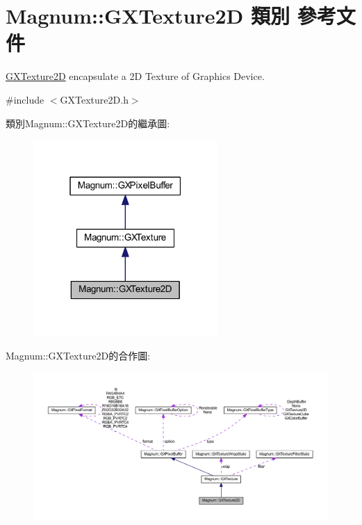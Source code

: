 \hypertarget{class_magnum_1_1_g_x_texture2_d}{}\section{Magnum\+:\+:G\+X\+Texture2D 類別 參考文件}
\label{class_magnum_1_1_g_x_texture2_d}


\hyperlink{class_magnum_1_1_g_x_texture2_d}{G\+X\+Texture2D} encapsulate a 2D Texture of Graphics Device.  




{\ttfamily \#include $<$G\+X\+Texture2\+D.\+h$>$}



類別\+Magnum\+:\+:G\+X\+Texture2\+D的繼承圖\+:\nopagebreak
\begin{figure}[H]
\begin{center}
\leavevmode
\includegraphics[width=199pt]{class_magnum_1_1_g_x_texture2_d__inherit__graph}
\end{center}
\end{figure}


Magnum\+:\+:G\+X\+Texture2\+D的合作圖\+:\nopagebreak
\begin{figure}[H]
\begin{center}
\leavevmode
\includegraphics[width=350pt]{class_magnum_1_1_g_x_texture2_d__coll__graph}
\end{center}
\end{figure}
